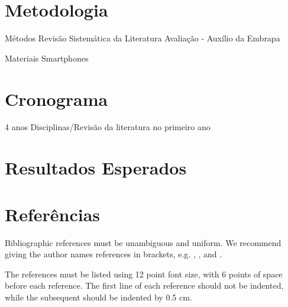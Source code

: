 \documentclass[12pt]{article}
\begin{document}
\section{Metodologia}

	Métodos
		Revisão Sistemática da Literatura
		Avaliação - Auxílio da Embrapa

	Materiais
		Smartphones

\section{Cronograma}

4 anos
Disciplinas/Revisão da literatura no primeiro ano

\section{Resultados Esperados}

\section{Referências}

Bibliographic references must be unambiguous and uniform.  We recommend giving
the author names references in brackets, e.g. \cite{knuth:84},
\cite{boulic:91}, and \cite{smith:99}.

The references must be listed using 12 point font size, with 6 points of space
before each reference. The first line of each reference should not be
indented, while the subsequent should be indented by 0.5 cm.



\end{document}
